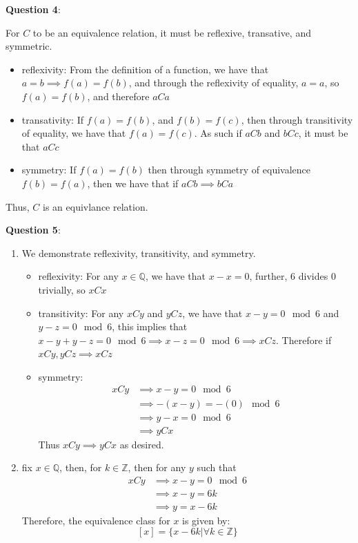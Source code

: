 \documentclass{article} %
\newcommand{\question}[2][]{
  \begin{flushleft}
    \textbf{Question #1}: \textit{#2}

\end{flushleft}}
\begin{document}
\question[4]{}

For $C$ to be an equivalence relation, it must be reflexive,
transative, and symmetric.
\begin{itemize}
  \item reflexivity: From the definition of a function, we have that
    $a = b \implies f(a) = f(b)$, and through the reflexivity of
    equality, $a = a$, so $f(a) =
    f(b)$, and therefore $aCa$
  \item transativity: If $f(a) = f(b)$, and $f(b) = f(c)$, then
    through transitivity of equality, we have that $f(a) = f(c)$. As
    such if $aCb$ and $bCc$, it must be that $aCc$
  \item symmetry: If $f(a) = f(b)$ then through symmetry of
    equivalence $f(b) = f(a)$, then we have that if $aCb \implies bCa$
\end{itemize}
Thus, $C$ is an equivlance relation.

\question[5]{}
\begin{enumerate}
  \item We demonstrate reflexivity, transitivity, and symmetry.
    \begin{itemize}
      \item reflexivity: For any $x \in \mathbb{Q}$, we have that $x
        - x = 0$, further, $6$ divides $0$ trivially, so $xCx$
      \item transitivity: For any $xCy$ and $yCz$, we have that $x -
        y  = 0 \mod 6$ and $y - z = 0 \mod 6$, this implies that $x -
        y + y - z = 0 \mod 6 \implies x - z = 0 \mod 6 \implies xCz$.
        Therefore if $xCy, y Cz \implies xCz$
      \item symmetry:
        \begin{align*}
          xCy &\implies x - y = 0 \mod 6\\
          &\implies -(x - y) = -(0)\mod 6 \\
          &\implies y - x = 0 \mod 6 \\
          &\implies yCx
        \end{align*}
        Thus $xCy \implies yCx$ as desired.
    \end{itemize}
  \item fix $x \in \mathbb{Q}$, then, for $k \in \mathbb{Z}$, then
    for any $y$ such that
    \begin{align*}
      xCy &\implies x - y = 0 \mod 6 \\
      &\implies x - y =  6k \\
      &\implies y = x - 6k
    \end{align*}
    Therefore, the equivalence class for $x$ is given by:
    \[
      [x] = \{x - 6k | \forall k \in \mathbb{Z}\}
    \]
\end{enumerate}
\end{document}
